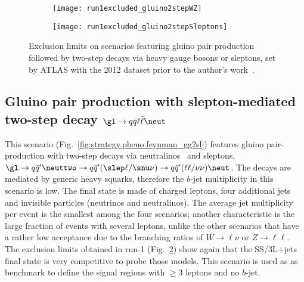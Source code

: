 \begin{figure}[t]
\centering
\begin{subfigure}[t]{0.49\textwidth}\texttt{[image: run1excluded\_gluino2stepWZ]}\caption{}\label{fig:strategy.pheno.run1excluded_gluino2stepWZ}\end{subfigure} 
\begin{subfigure}[t]{0.49\textwidth}\texttt{[image: run1excluded\_gluino2stepSleptons]}\caption{}\label{fig:strategy.pheno.run1excluded_gluino2stepSleptons}\end{subfigure}
\caption{Exclusion limits on scenarios featuring gluino pair production followed by two-step decays via heavy gauge bosons or sleptons, 
set by ATLAS with the 2012 dataset prior to the author's work~\cite{SUSY-2014-06}.}
\label{fig:strategy.pheno.run1excluded_1stgen}
\end{figure}

\subsection*{Gluino pair production with slepton-mediated two-step decay $\gl\to q\bar q\ell\bar\ell\neut$}
\label{subsec:signals_g2slep}

This scenario (Fig.~\ref{fig:strategy.pheno.feynman_gg2sl}) features gluino pair-production with two-step decays via neutralinos \neuttwo\ and sleptons, 
$\gl\to q\bar{q}'\neuttwo \to q\bar{q}'(\slep\ell/\snu\nu) \to q\bar{q}'(\ell\ell/\nu\nu)\neut$. 
The decays are mediated by generic heavy squarks, therefore the $b$-jet multiplicity in this scenario is low. 
The final state is made of charged leptons, four additional jets and invisible particles (neutrinos and neutralinos). 
The average jet multiplicity per event is the smallest among the four scenarios;  
another characteristic is the large fraction of events with several leptons, 
unlike the other scenarios that have a rather low acceptance due to the branching ratios of $W\to\ell\nu$ or $Z\to\ell\ell$. 
The exclusion limits obtained in run-1 (Fig.~\ref{fig:strategy.pheno.run1excluded_gluino2stepSleptons}) show again that the SS/3L+jets final state 
is very competitive to probe those models. 
This scenario is used as as benchmark to define the signal regions with $\ge 3$ leptons and no $b$-jet. 

